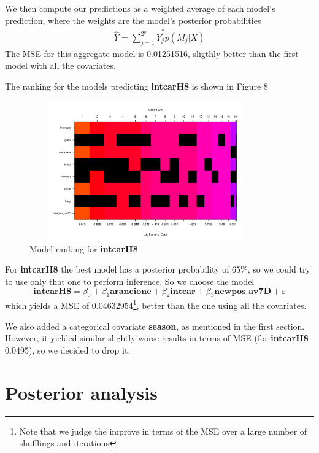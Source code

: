 \documentclass[12pt,a4paper]{article}
\theoremstyle{definition}
\theoremstyle{remark}
\begin{document}
We then compute our predictions as a weighted average of each model's prediction, where the weights are the model's posterior probabilities
\begin{align*}
	\hat{Y} = \sum_{j=1}^{2^p}\hat{Y}^*_jp(M_j|X)
\end{align*}
The MSE for this aggregate model is 0.01251516, sligthly better than the first model with all the covariates.

The ranking for the models predicting \textbf{intcarH8} is shown in Figure 8
\begin{figure}[htb!]
	\centering
	\includegraphics[width=100mm, height=60mm,scale=0.5]{ranking2.pdf}
	\caption{Model ranking for \textbf{intcarH8} }
\end{figure}
For \textbf{intcarH8} the best model has a posterior probability of 65\%, so we could try to use only that one to perform inference. So we choose the model
\begin{dmath*}
	\textbf{intcarH8} = \beta_0 + \beta_1\textbf{arancione} +  \beta_2\textbf{intcar} + \beta_3\textbf{newpos\_av7D} + \varepsilon
\end{dmath*}
which yields a MSE of 0.04632954\footnote{Note that we judge the improve in terms of the MSE over a large number of shufflings and iterations}, better than the one using all the covariates.

We also added a categorical covariate \textbf{season}, as mentioned in the first section. However, it yielded similar slightly worse results in terms of MSE (for \textbf{intcarH8} 0.0495), so we decided to drop it. 
\newpage
\section{Posterior analysis}
\end{document}
